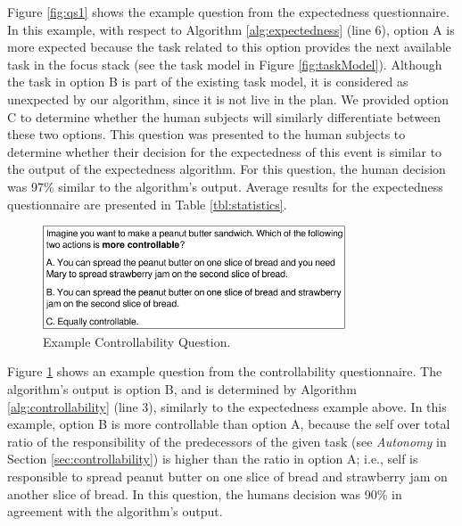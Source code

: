 Figure \ref{fig:qs1} shows the example question from the expectedness
questionnaire. In this example, with respect to Algorithm
\ref{alg:expectedness} (line 6), option A is more expected because the task
related to this option provides the next available task in the focus stack (see
the task model in Figure \ref{fig:taskModel}). Although the task in option B is
part of the existing task model, it is considered as unexpected by our
algorithm, since it is not live in the plan. We provided option C to determine
whether the human subjects will similarly differentiate between these two
options. This question was presented to the human subjects to determine whether
their decision for the expectedness of this event is similar to the output of
the expectedness algorithm. For this question, the human decision was 97\%
similar to the algorithm's output. Average results for the expectedness
questionnaire are presented in Table \ref{tbl:statistics}.

\begin{figure}[tbh]
  \vspace{-1mm}
  \centering
  \includegraphics[width=0.8\textwidth]{figure/question-sample2-croped.pdf}
  \caption{{\fontsize{9}{9}\selectfont Example Controllability Question.}}
  \label{fig:qs2}
  \vspace{-2mm}
\end{figure}

Figure \ref{fig:qs2} shows an example question from the controllability
questionnaire. The algorithm's output is option B, and is determined by
Algorithm \ref{alg:controllability} (line 3), similarly to the expectedness
example above. In this example, option B is more controllable than option A,
because the self over total ratio of the responsibility of the predecessors of
the given task (see \textit{Autonomy} in Section \ref{sec:controllability}) is
higher than the ratio in option A; i.e., self is responsible to spread peanut
butter on one slice of bread and strawberry jam on another slice of bread. In
this question, the humans decision was 90\% in agreement with the algorithm's
output.

